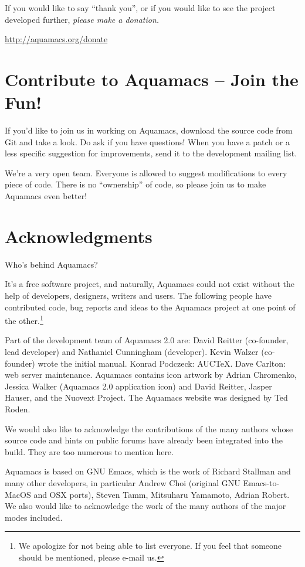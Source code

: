 \documentclass[11pt,letterpaper]{article}
\begin{document}
If you would like to say ``thank you'', or if you would like to see
the project developed further, \emph{please make a donation.}

\url{http://aquamacs.org/donate}


\section {Contribute to Aquamacs -- Join the Fun!}

If you'd like to join us in working on Aquamacs, download the source
code from Git and take a look. Do ask if you have questions! When you
have a patch or a less specific suggestion for improvements, send it
to the development mailing list.

We're a very open team. Everyone is allowed to suggest modifications
to every piece of code. There is no ``ownership'' of code, so please
join us to make Aquamacs even better!


\section{Acknowledgments}

Who's behind Aquamacs?

It's a free software project, and naturally, Aquamacs could not exist
without the help of developers, designers, writers and users. The
following people have contributed code, bug reports and ideas to the
Aquamacs project at one point of the other.\footnote{We apologize for not being able to list everyone.  If you feel that someone should be mentioned, please e-mail us.}

Part of the development team of Aquamacs 2.0 are:  David Reitter (co-founder, lead developer) and Nathaniel Cunningham (developer).  
Kevin Walzer (co-founder) wrote the initial manual. Konrad Podczeck: AUCTeX.  Dave Carlton: web server maintenance.  Aquamacs contains icon artwork by Adrian Chromenko, Jessica Walker (Aquamacs 2.0 application icon) and David Reitter,
Jasper Hauser, and the Nuovext Project.  The Aquamacs website was designed by Ted Roden.

We would also like to acknowledge the contributions of the many authors 
whose source code and hints on public forums have already been
integrated into the build.  They are too numerous to mention here.

Aquamacs is based on GNU Emacs, which is the work of Richard Stallman
and many other developers, in particular Andrew Choi (original GNU
Emacs-to-MacOS and OSX ports), Steven Tamm, Mitsuharu Yamamoto, Adrian Robert. We also would like to acknowledge the work
of the many authors of the major modes included.
\end{document}
